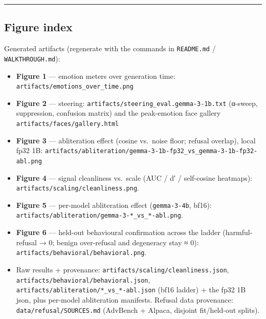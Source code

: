 \documentclass[
]{article}
\providecommand{\tightlist}{%
  \setlength{\itemsep}{0pt}\setlength{\parskip}{0pt}}
\begin{document}
\begin{center}\rule{0.5\linewidth}{0.5pt}\end{center}

\subsection{Figure index}\label{figure-index}

Generated artifacts (regenerate with the commands in \texttt{README.md}
/ \texttt{WALKTHROUGH.md}):

\begin{itemize}
\tightlist
\item
  \textbf{Figure 1} --- emotion meters over generation time:
  \texttt{artifacts/emotions\_over\_time.png}
\item
  \textbf{Figure 2} --- steering:
  \texttt{artifacts/steering\_eval.gemma-3-1b.txt} (α-sweep,
  suppression, confusion matrix) and the peak-emotion face gallery
  \texttt{artifacts/faces/gallery.html}
\item
  \textbf{Figure 3} --- abliteration effect (cosine vs.~noise floor;
  refusal overlap), local fp32 1B:
  \texttt{artifacts/abliteration/gemma-3-1b-fp32\_vs\_gemma-3-1b-fp32-abl.png}
\item
  \textbf{Figure 4} --- signal cleanliness vs.~scale (AUC / d′ /
  self-cosine heatmaps): \texttt{artifacts/scaling/cleanliness.png}.
\item
  \textbf{Figure 5} --- per-model abliteration effect
  (\texttt{gemma-3-4b}, bf16):
  \texttt{artifacts/abliteration/gemma-3-*\_vs\_*-abl.png}.
\item
  \textbf{Figure 6} --- held-out behavioural confirmation across the
  ladder (harmful-refusal → 0; benign over-refusal and degeneracy stay ≈
  0): \texttt{artifacts/behavioral/behavioral.png}.
\item
  Raw results + provenance: \texttt{artifacts/scaling/cleanliness.json},
  \texttt{artifacts/behavioral/behavioral.json},
  \texttt{artifacts/abliteration/*\_vs\_*-abl.json} (bf16 ladder) + the
  fp32 1B json, plus per-model abliteration manifests. Refusal data
  provenance: \texttt{data/refusal/SOURCES.md} (AdvBench + Alpaca,
  disjoint fit/held-out splits).
\end{itemize}


\end{document}
